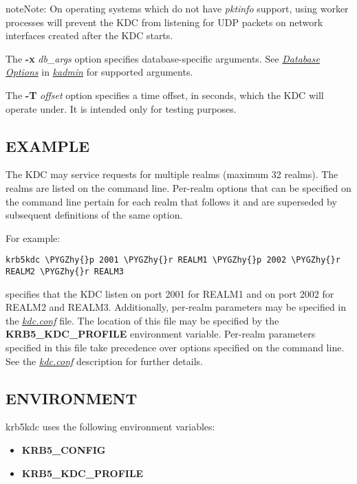 \documentclass[letterpaper,10pt,english]{sphinxmanual}
\def\PYGZhy{\char`\-}
\begin{document}
\begin{notice}{note}{Note:}
On operating systems which do not have \emph{pktinfo} support,
using worker processes will prevent the KDC from listening
for UDP packets on network interfaces created after the KDC
starts.
\end{notice}

The \textbf{-x} \emph{db\_args} option specifies database-specific arguments.
See {\hyperref[admin/admin_commands/kadmin_local:dboptions]{\emph{Database Options}}} in {\hyperref[admin/admin_commands/kadmin_local:kadmin-1]{\emph{kadmin}}} for
supported arguments.

The \textbf{-T} \emph{offset} option specifies a time offset, in seconds, which
the KDC will operate under.  It is intended only for testing purposes.


\subsection{EXAMPLE}
\label{admin/admin_commands/krb5kdc:example}
The KDC may service requests for multiple realms (maximum 32 realms).
The realms are listed on the command line.  Per-realm options that can
be specified on the command line pertain for each realm that follows
it and are superseded by subsequent definitions of the same option.

For example:

\begin{Verbatim}[commandchars=\\\{\}]
krb5kdc \PYGZhy{}p 2001 \PYGZhy{}r REALM1 \PYGZhy{}p 2002 \PYGZhy{}r REALM2 \PYGZhy{}r REALM3
\end{Verbatim}

specifies that the KDC listen on port 2001 for REALM1 and on port 2002
for REALM2 and REALM3.  Additionally, per-realm parameters may be
specified in the {\hyperref[admin/conf_files/kdc_conf:kdc-conf-5]{\emph{kdc.conf}}} file.  The location of this file
may be specified by the \textbf{KRB5\_KDC\_PROFILE} environment variable.
Per-realm parameters specified in this file take precedence over
options specified on the command line.  See the {\hyperref[admin/conf_files/kdc_conf:kdc-conf-5]{\emph{kdc.conf}}}
description for further details.


\subsection{ENVIRONMENT}
\label{admin/admin_commands/krb5kdc:environment}
krb5kdc uses the following environment variables:
\begin{itemize}
\item {} 
\textbf{KRB5\_CONFIG}

\item {} 
\textbf{KRB5\_KDC\_PROFILE}

\end{itemize}
\end{document}
